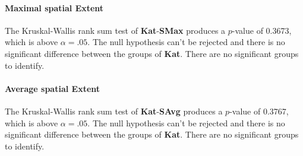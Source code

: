 \paragraph{Maximal spatial Extent}
The Kruskal-Wallis rank sum test of \textbf{Kat}-\textbf{SMax} produces a $p$-value of 0.3673, which is above $\alpha=.05$. The null hypothesis can't be rejected and there is no significant difference between the groups of \textbf{Kat}. There are no significant groups to identify.

\paragraph{Average spatial Extent}
The Kruskal-Wallis rank sum test of \textbf{Kat}-\textbf{SAvg} produces a $p$-value of 0.3767, which is above $\alpha=.05$. The null hypothesis can't be rejected and there is no significant difference between the groups of \textbf{Kat}. There are no significant groups to identify.

